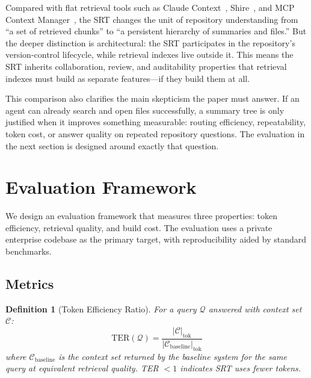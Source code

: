 \documentclass[11pt,a4paper]{article}
\newtheorem{definition}{Definition}
\newcommand{\srt}{\textsc{SRT}}
\newcommand{\query}{\mathcal{Q}}
\newcommand{\context}{\mathcal{C}}
\begin{document}
Compared with flat retrieval tools such as Claude Context~\cite{claudecontext}, Shire~\cite{shire}, and MCP Context Manager~\cite{mcpcontext}, the \srt{} changes the unit of repository understanding from ``a set of retrieved chunks'' to ``a persistent hierarchy of summaries and files.'' But the deeper distinction is architectural: the \srt{} participates in the repository's version-control lifecycle, while retrieval indexes live outside it. This means the \srt{} inherits collaboration, review, and auditability properties that retrieval indexes must build as separate features---if they build them at all.

This comparison also clarifies the main skepticism the paper must answer. If an agent can already search and open files successfully, a summary tree is only justified when it improves something measurable: routing efficiency, repeatability, token cost, or answer quality on repeated repository questions. The evaluation in the next section is designed around exactly that question.

\section{Evaluation Framework}\label{sec:evaluation}

We design an evaluation framework that measures three properties: token efficiency, retrieval quality, and build cost.
The evaluation uses a private enterprise codebase as the primary target, with reproducibility aided by standard benchmarks.

\subsection{Metrics}\label{sec:metrics}

\begin{definition}[Token Efficiency Ratio]\label{def:ter}
For a query $\query$ answered with context set $\context$:
\begin{equation}\label{eq:ter}
    \text{TER}(\query) = \frac{|\context|_{\text{tok}}}{|\context_{\text{baseline}}|_{\text{tok}}}
\end{equation}
where $\context_{\text{baseline}}$ is the context set returned by the baseline system for the same query at equivalent retrieval quality.
TER $< 1$ indicates \srt{} uses fewer tokens.
\end{definition}
\end{document}
